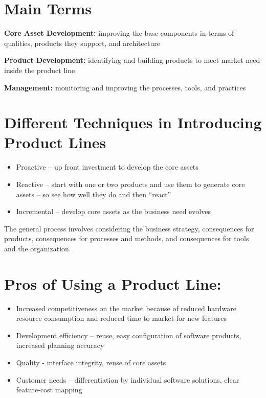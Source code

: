 \documentclass{report}
\begin{document}
\section{Main Terms}
\textbf{Core Asset Development:} improving the base components in terms of qualities, products they support, and architecture

\textbf{Product Development:} identifying and building products to meet market need inside the product line

\textbf{Management:} monitoring and improving the processes, tools, and practices

\section{Different Techniques in Introducing Product Lines}
\begin{itemize}
\item Proactive – up front investment to develop the core assets
\item Reactive – start with one or two products and use them to generate core assets – so see how well they do and then “react”
\item Incremental – develop core assets as the business need evolves
\end{itemize}
The general process involves considering the business strategy, consequences for products, consequences for processes and methods, and consequences for tools and the organization.

\section{Pros of Using a Product Line:}
\begin{itemize}
\item Increased competitiveness on the market because of reduced hardware resource consumption and reduced time to market for new features
\item Development efficiency – reuse, easy configuration of software products, increased planning accuracy
\item Quality  - interface integrity, reuse of core assets
\item Customer needs – differentiation by individual software solutions, clear feature-cost mapping
\end{itemize}
\end{document}
